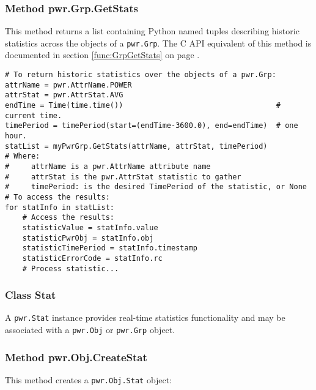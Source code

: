 \subsubsection{Method pwr.Grp.GetStats} \label{class:GrpGetStats}

This method returns a list containing Python named tuples describing historic statistics
across the objects of a \texttt{pwr.Grp}.
The C API equivalent of this method is documented in section
\ref{func:GrpGetStats} on page \pageref{func:GrpGetStats}.

\begin{center}\begin{minipage}{.95\linewidth}\begin{lstlisting}
# To return historic statistics over the objects of a pwr.Grp:
attrName = pwr.AttrName.POWER
attrStat = pwr.AttrStat.AVG
endTime = Time(time.time())                                   # current time.
timePeriod = timePeriod(start=(endTime-3600.0), end=endTime)  # one hour.
statList = myPwrGrp.GetStats(attrName, attrStat, timePeriod)
# Where:
#     attrName is a pwr.AttrName attribute name
#     attrStat is the pwr.AttrStat statistic to gather
#     timePeriod: is the desired TimePeriod of the statistic, or None
# To access the results:
for statInfo in statList:
    # Access the results:
    statisticValue = statInfo.value
    statisticPwrObj = statInfo.obj
    statisticTimePeriod = statInfo.timestamp
    statisticErrorCode = statInfo.rc
    # Process statistic...
\end{lstlisting}\end{minipage}\end{center}

\subsubsection{Class Stat} \label{class:CreateStat}

A \texttt{pwr.Stat} instance provides real-time statistics functionality and may be associated with a \texttt{pwr.Obj} or \texttt{pwr.Grp} object.

\subsubsection{Method pwr.Obj.CreateStat } \label{meth:ObjCreateStat}

This method creates a \texttt{pwr.Obj.Stat} object:

